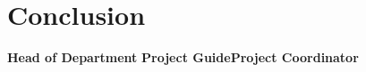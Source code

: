 \chapter{Conclusion}\label{ch:conclusion}
\vspace{200px}
\centering
\textbf{Head of Department}
\vspace{50px}
\flushleft\textbf{Project Guide}\hfill\textbf{Project Coordinator}